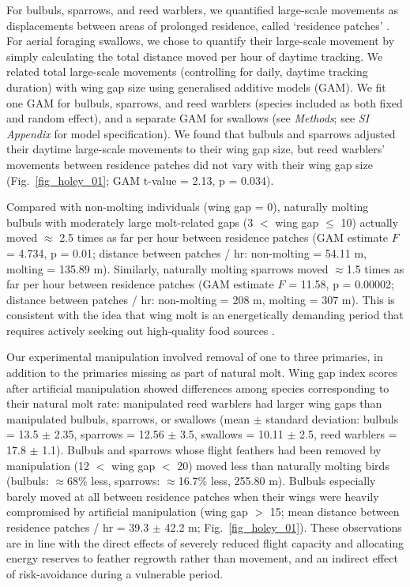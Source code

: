 \begin{refsection}
For bulbuls, sparrows, and reed warblers, we quantified large-scale movements as displacements between areas of prolonged residence, called `residence patches' \cite{gupte2022d}.
For aerial foraging swallows, we chose to quantify their large-scale movement by simply calculating the total distance moved per hour of daytime tracking.
We related total large-scale movements (controlling for daily, daytime tracking duration) with wing gap size using generalised additive models (GAM).
We fit one GAM for bulbuls, sparrows, and reed warblers (species included as both fixed and random effect), and a separate GAM for swallows (see \textit{Methods}; see \textit{SI Appendix} for model specification).
We found that bulbuls and sparrows adjusted their daytime large-scale movements to their wing gap size, but reed warblers' movements between residence patches did not vary with their wing gap size (Fig.~\ref{fig_holey_01}; GAM t-value = 2.13, p = 0.034).

Compared with non-molting individuals (wing gap = 0), naturally molting bulbuls with moderately large molt-related gaps (3 $<$ wing gap $\leq$ 10) actually moved $\approx$ 2.5 times as far per hour between residence patches (GAM estimate $F$ = 4.734, p = 0.01; distance between patches / hr: non-molting = 54.11 m, molting = 135.89 m).
Similarly, naturally molting sparrows moved {$\approx$1.5 times} as far per hour between residence patches (GAM estimate $F$ = 11.58, p = 0.00002; distance between patches / hr: non-molting = 208 m, molting = 307 m).
This is consistent with the idea that wing molt is an energetically demanding period that requires actively seeking out high-quality food sources \citep{madsen1987a,fox1998}.

Our experimental manipulation involved removal of one to three primaries, in addition to the primaries missing as part of natural molt.
Wing gap index scores after artificial manipulation showed differences among species corresponding to their natural molt rate: manipulated reed warblers had larger wing gaps than manipulated bulbuls, sparrows, or swallows {(mean $\pm$ standard deviation: bulbuls = 13.5 $\pm$ 2.35, sparrows = 12.56 $\pm$ 3.5, swallows = 10.11 $\pm$ 2.5, reed warblers = 17.8 $\pm$ 1.1).}
Bulbuls and sparrows whose flight feathers had been removed by manipulation (12 $<$ wing gap $<$ 20) moved less than naturally molting birds {(bulbuls: $\approx$68\% less, sparrows: $\approx$16.7\% less, 255.80 m)}.
Bulbuls especially barely moved at all between residence patches when their wings were heavily compromised by artificial manipulation (wing gap $>$ 15; mean distance between residence patches / hr = 39.3 $\pm$ 42.2 m; Fig.~\ref{fig_holey_01}).
These observations are in line with the direct effects of severely reduced flight capacity and allocating energy reserves to feather regrowth rather than movement, and an indirect effect of risk-avoidance during a vulnerable period.


\end{refsection}
